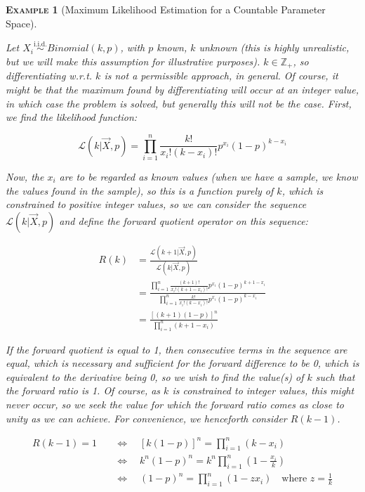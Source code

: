 \documentclass[12pt,a4paper]{article}
\newtheorem{example}{\textsc{Example}}[section]
\begin{document}
\begin{example}[Maximum Likelihood Estimation for a Countable Parameter Space]$\;$\par\vspace{1cm}

Let $X_i \overset{\text{i.i.d.}}{\sim} Binomial(k,p)$, with $p$ known, $k$ unknown (this is highly unrealistic, but we will make this assumption for illustrative purposes). $k \in \mathbb{Z}_+$, so differentiating w.r.t. $k$ is not a permissible approach, in general. Of course, it might be that the maximum found by differentiating will occur at an integer value, in which case the problem is solved, but generally this will not be the case. First, we find the likelihood function:

$$\mathcal{L}(k | \vec{X},p) = \prod_{i=1}^n \frac{k!}{x_i! (k - x_i)!} p^{x_i} (1-p)^{k-x_i}$$

Now, the $x_i$ are to be regarded as known values (when we have a sample, we know the values found in the sample), so this is a function purely of $k$, which is constrained to positive integer values, so we can consider the sequence $\mathcal{L}(k | \vec{X},p)$ and define the forward quotient operator on this sequence:

\begin{align*}
R(k) &= \frac{\mathcal{L}(k+1 | \vec{X},p)}{\mathcal{L}(k | \vec{X},p)}\\
&= \frac{\prod\limits_{i=1}^n \frac{(k+1)!}{x_i! (k+1-x_i)!} p^{x_i} (1-p)^{k+1-x_i}}{\prod\limits_{i=1}^n \frac{k!}{x_i!(k-x_i)!} p^{x_i}(1-p)^{k-x_i}}\\
&= \frac{[(k+1)(1-p)]^n}{\prod\limits_{i=1}^n (k+1-x_i)}
\end{align*}

If the forward quotient is equal to 1, then consecutive terms in the sequence are equal, which is necessary and sufficient for the forward difference to be 0, which is equivalent to the derivative being 0, so we wish to find the value(s) of $k$ such that the forward ratio is 1. Of course, as $k$ is constrained to integer values, this might never occur, so we seek the value for which the forward ratio comes as close to unity as we can achieve. For convenience, we henceforth consider $R(k-1)$.

\begin{align*}
R(k-1) = 1 \quad&\Leftrightarrow\quad [k(1-p)]^n = \prod_{i=1}^n (k-x_i)\\
&\Leftrightarrow\quad k^n(1-p)^n = k^n \prod_{i=1}^n \left(1 - \frac{x_i}{k}\right)\\
&\Leftrightarrow\quad (1-p)^n = \prod_{i=1}^n (1-zx_i)\quad \textrm{where } z = \frac{1}{k}
\end{align*}


\end{example}
\end{document}
